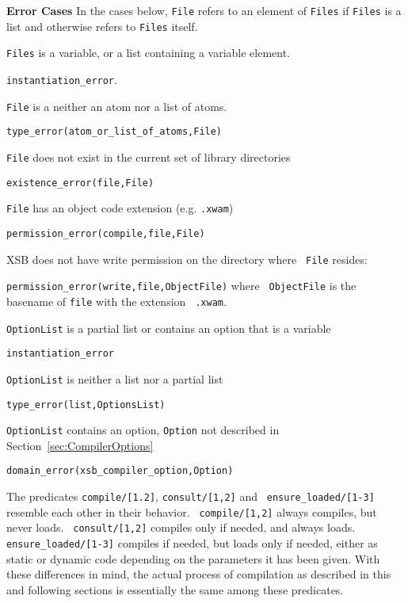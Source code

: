 \begin{description}
{\bf Error Cases}
In the cases below, {\tt File} refers to an element of {\tt Files} if
{\tt Files} is a list and otherwise refers to {\tt Files} itself.
\bi
\item 	{\tt Files} is a variable, or a list containing a variable element.
\bi
\item 	{\tt instantiation\_error}.
\ei
\item  {\tt File} is a neither an atom nor a list of atoms.
\bi
\item 	{\tt type\_error(atom\_or\_list\_of\_atoms,File)}
\ei
\item  {\tt File} does not exist in the current set of
  library directories 
\bi
\item 	{\tt existence\_error(file,File)}
\ei
%
\item 	{\tt File} has an object code extension (e.g. {\tt .xwam})
  \bi
\item 	{\tt permission\_error(compile,file,File)}
  \ei
\item XSB does not have write permission on the directory where {\tt
  File} resides:
  \bi
\item {\tt permission\_error(write,file,ObjectFile)} where {\tt
  ObjectFile} is the basename of {\tt file} with the extension {\tt
  .xwam}.
\ei  
\item 	{\tt OptionList} is a partial list or contains an option that is a variable
\bi
\item 	{\tt instantiation\_error}
\ei
\item 	{\tt OptionList} is neither a list nor a partial list
\bi
\item 	{\tt type\_error(list,OptionsList)}
\ei
\item {\tt OptionList} contains an option, {\tt Option} not described
  in Section~\ref{sec:CompilerOptions} 
\bi
\item 	{\tt domain\_error(xsb\_compiler\_option,Option)}
\ei
\ei
\end{description}

The predicates {\tt compile/[1.2]}, {\tt consult/[1,2]} and {\tt
  ensure\_loaded/[1-3]} resemble each other in their behavior.  {\tt
  compile/[1,2]} always compiles, but never loads.  {\tt
  consult/[1,2]} compiles only if needed, and always loads.  {\tt
  ensure\_loaded/[1-3]} compiles if needed, but loads only if needed,
either as static or dynamic code depending on the parameters it has
been given.  With these differences in mind, the actual process of
compilation as described in this and following sections is essentially
the same among these predicates.

